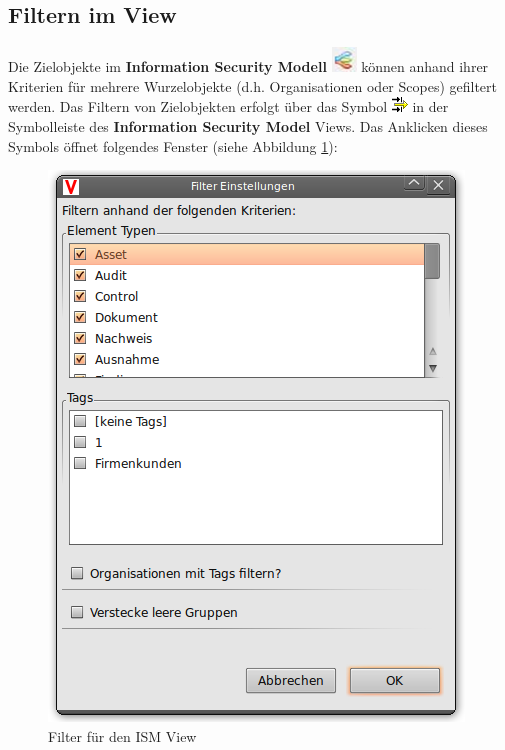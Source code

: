 \documentclass[a4paper,10pt]{book}
\begin{document}
\subsection{Filtern im View}
Die Zielobjekte im \textbf{Information Security Modell} \includegraphics[height=2ex]{Icon/Informationssicherheitsmodell.png} können
anhand ihrer Kriterien für mehrere Wurzelobjekte (d.h. Organisationen oder Scopes) gefiltert werden.
Das Filtern von Zielobjekten erfolgt über das Symbol \includegraphics[height=2ex]{Icon/Filter.png} in der Symbolleiste des \textbf{Information Security Model} Views.
Das Anklicken dieses Symbols öffnet folgendes Fenster (siehe Abbildung \ref{Filter fuer den ISM View}):
\newline
\begin{figure}[htb!]
  \centering
  \includegraphics[scale=.7]{Screenshot/Ism-filter.png}
  \caption{\label{Filter fuer den ISM View} Filter für den ISM View}
\end{figure}
\newline
\end{document}
